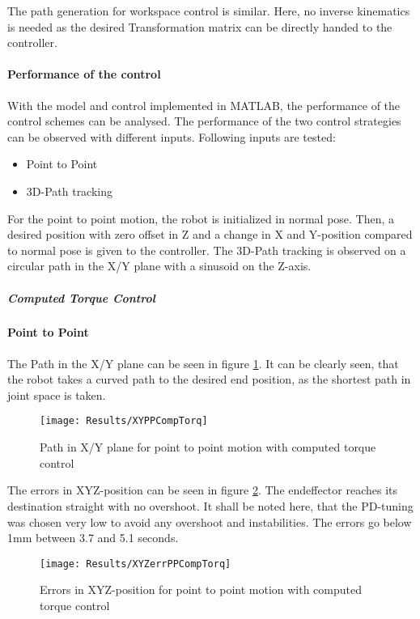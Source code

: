 The path generation for workspace control is similar. Here, no inverse kinematics is needed as the desired Transformation matrix can be directly handed to the controller. 

\paragraph{Performance of the control}

With the model and control implemented in MATLAB, the performance of the control schemes can be analysed.
The performance of the two control strategies can be observed with different inputs.
Following inputs are tested:
\begin{itemize}
	\item Point to Point
	\item 3D-Path tracking
\end{itemize}
For the point to point motion, the robot is initialized in normal pose. Then, a desired position with zero offset in Z and a change in X and Y-position compared to normal pose is given to the controller.
The 3D-Path tracking is observed on a circular path in the X/Y plane with a sinusoid on the Z-axis.


\subparagraph{Computed Torque Control}

\paragraph{Point to Point}
The Path in the X/Y plane can be seen in figure  \ref{fig:XYPPCompTorq}. 
It can be clearly seen, that the robot takes a curved path to the desired end position, as the shortest path in joint space is taken.
\begin{figure}[H]
	\texttt{[image: Results/XYPPCompTorq]}
	\caption{Path in X/Y plane for point to point motion with computed torque control}
	\label{fig:XYPPCompTorq}
\end{figure}
The errors in XYZ-position can be seen in figure \ref{fig:XYZerrPPCompTorq}. %
The endeffector reaches its destination straight with no overshoot. It shall be noted here, that the PD-tuning was chosen very low to avoid any overshoot and instabilities. The errors go below 1mm between 3.7 and 5.1 seconds.
\begin{figure}[H]
	\texttt{[image: Results/XYZerrPPCompTorq]}
	\caption{Errors in XYZ-position for point to point motion with computed torque control}
	\label{fig:XYZerrPPCompTorq}
\end{figure}


